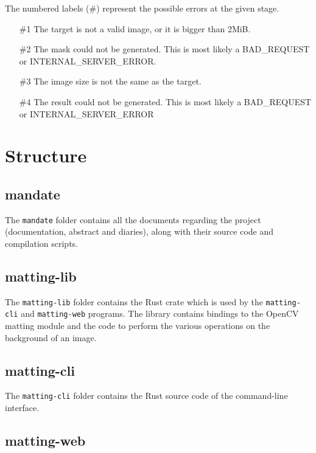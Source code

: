 \documentclass[a4paper]{article}
\begin{document}
The numbered labels (\#) represent the possible errors at the given stage.

\begin{itemize}
    \item[\#1] The target is not a valid image, or it is bigger than 2MiB.
    \item[\#2] The mask could not be generated.
        This is most likely a \textsc{BAD\_REQUEST}
        or \textsc{INTERNAL\_SERVER\_ERROR}.
    \item[\#3] The image size is not the same as the target.
    \item[\#4] The result could not be generated.
        This is most likely a \textsc{BAD\_REQUEST}
        or \textsc{INTERNAL\_SERVER\_ERROR}
\end{itemize}

\pagebreak

\section{Structure}

\subsection{mandate}

The \texttt{mandate} folder contains all the documents regarding
the project (documentation, abstract and diaries),
along with their source code and compilation scripts.

\subsection{matting-lib}

The \texttt{matting-lib} folder contains the \gls{Rust} crate
which is used by the \texttt{matting-cli}
and \texttt{matting-web} programs.
The library contains bindings to the OpenCV \gls{matting} module
and the code to perform the various operations on the background
of an image.

\subsection{matting-cli}

The \texttt{matting-cli} folder contains the Rust
source code of the command-line interface.

\subsection{matting-web}
\end{document}
